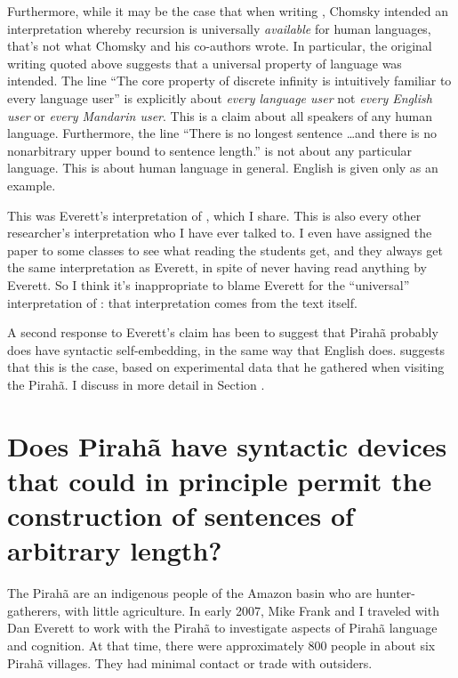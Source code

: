 \documentclass{article}
\begin{document}
Furthermore, while it may be the case that when writing \citet{hauser2002faculty}, Chomsky intended an interpretation whereby recursion is universally \textit{available} for human languages, that's not what Chomsky and his co-authors wrote.
In particular, the original writing quoted above suggests that a universal property of language was intended. The line ``The core property of discrete infinity is intuitively familiar to every language user'' is explicitly about \textit{every language user} not \textit{every English user} or \textit{every Mandarin user}.  This is a claim about all speakers of any human language. Furthermore, the line ``There is no longest sentence  \ldots  and there is no nonarbitrary upper bound to sentence length.'' is not about any particular language. This is about human language in general. English is given only as an example. 

This was Everett’s interpretation of \citet{hauser2002faculty}, which I share. This is also every other researcher’s interpretation who I have ever talked to. I even have assigned the \citet{hauser2002faculty} paper to some classes to see what reading the students get, and they always get the same interpretation as Everett, in spite of never having read anything by Everett.  So I think it’s inappropriate to blame Everett for the ``universal'' interpretation of \citet{hauser2002faculty}: that interpretation comes from the text itself. 

A second response to Everett’s claim has been to suggest that Pirahã probably does have syntactic self-embedding, in the same way that English does. \citet{sauerland2018false} suggests that this is the case, based on experimental data that he gathered when visiting the Pirahã. I discuss in more detail in Section .

\section{Does Pirahã have  syntactic devices that could in principle permit the construction of sentences of arbitrary length?}

The Pirahã are an indigenous people of the Amazon basin who are hunter\hyp gatherers, with little agriculture.  In early 2007, Mike Frank and I traveled with Dan Everett to work with the Pirahã to investigate aspects of Pirahã language and cognition. At that time, there were approximately 800 people in about six Pirahã villages. They had minimal contact or trade with outsiders. 
\end{document}
